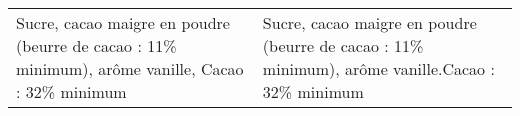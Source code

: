 \begin{tabular}{p{7cm}p{7cm}}
                                                                                                                                                                                                                                                                                                                                                                                                                                                                                                                                                                                                                                                                                                                                                                                                                                                                                                                                                                                                                                                                                                                                                                                                                                                                                                                                                                                                                                                                                                                                                                                                                   Sucre, cacao maigre en poudre (beurre de cacao : 11\% minimum), arôme vanille, Cacao : 32\% minimum &                                                                                                                                                                                                                                                                                                                                                                                                                                                           Sucre, cacao maigre en poudre (beurre de cacao : 11\% minimum), arôme vanille.\newline Cacao : 32\% minimum \\

\end{tabular}
